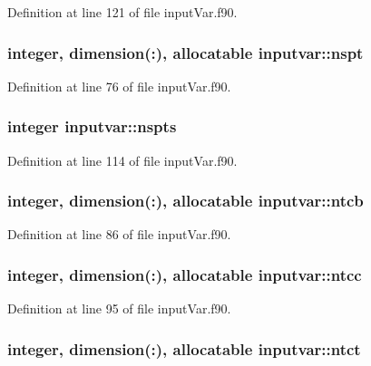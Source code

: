 Definition at line 121 of file input\-Var.\-f90.

\hypertarget{classinputvar_a0c86e9a7915872ee547e5bd8802611e7}{
\subsubsection[{nspt}]{\setlength{\rightskip}{0pt plus 5cm}integer, dimension(\-:), allocatable inputvar\-::nspt}}\label{classinputvar_a0c86e9a7915872ee547e5bd8802611e7}


Definition at line 76 of file input\-Var.\-f90.

\hypertarget{classinputvar_aaefd22e32dc26863fb189c2a0305ac3b}{
\subsubsection[{nspts}]{\setlength{\rightskip}{0pt plus 5cm}integer inputvar\-::nspts}}\label{classinputvar_aaefd22e32dc26863fb189c2a0305ac3b}


Definition at line 114 of file input\-Var.\-f90.

\hypertarget{classinputvar_a41aaaf97cb1f1e815c73bcfa5f975be3}{
\subsubsection[{ntcb}]{\setlength{\rightskip}{0pt plus 5cm}integer, dimension(\-:), allocatable inputvar\-::ntcb}}\label{classinputvar_a41aaaf97cb1f1e815c73bcfa5f975be3}


Definition at line 86 of file input\-Var.\-f90.

\hypertarget{classinputvar_aaf3cc67ce289abacf61f20f5fdcfc3f6}{
\subsubsection[{ntcc}]{\setlength{\rightskip}{0pt plus 5cm}integer, dimension(\-:), allocatable inputvar\-::ntcc}}\label{classinputvar_aaf3cc67ce289abacf61f20f5fdcfc3f6}


Definition at line 95 of file input\-Var.\-f90.

\hypertarget{classinputvar_ad5c9bbca95851da9fa84642ea414e6be}{
\subsubsection[{ntct}]{\setlength{\rightskip}{0pt plus 5cm}integer, dimension(\-:), allocatable inputvar\-::ntct}}\label{classinputvar_ad5c9bbca95851da9fa84642ea414e6be}



